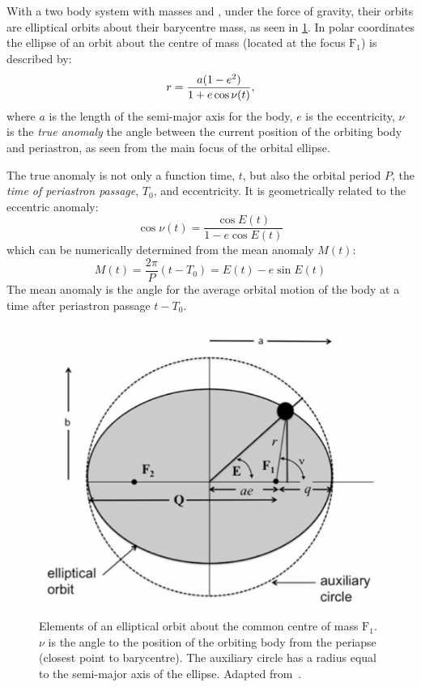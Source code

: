 With a two body system with masses \Mone{} and \Mtwo{}, under the force of gravity, their orbits are elliptical orbits about their barycentre mass, as seen in \cref{fig:eclipesorbit}.
In polar coordinates the ellipse of an orbit about the centre of mass (located at the focus $\textrm{F}_1$) is described by:
\begin{equation}
    r = \frac{a(1 - {e}^{2})}{1 + e \cos{\nu(t)}},
\end{equation}
where \(a\) is the length of the semi-major axis for the body, \(e\) is the eccentricity, $\nu$ is the \emph{true anomaly} the angle between the current position of the orbiting body and periastron, as seen from the main focus of the orbital ellipse.

The true anomaly is not only a function time, \(t\), but also the orbital period \(P\), the \emph{time of periastron passage}, \(T_0\), and eccentricity.
It is geometrically related to the eccentric anomaly:
\begin{equation}
    \cos{\nu(t)} = \frac{\cos{E(t)}}{1 - e \cos{E(t)}}
\end{equation}
which can be numerically determined from the mean anomaly \(M(t)\):
\begin{equation}
    M(t) = \frac{2 \pi}{P}(t - T_0) = E(t) - e \sin{E(t)}
\end{equation}
The mean anomaly is the angle for the average orbital motion of the body at a time after periastron passage \(t-T_0\).

\begin{figure}
    \centering
    \includegraphics[width=0.55\linewidth]{figures/fundamental_rv/eclipes_orbit2.pdf}
    \caption[Elements of an elliptical orbit.]{Elements of an elliptical orbit about the common centre of mass \(\textrm{F}_1\).
        {\(\nu\)} is the angle to the position of the orbiting body from the periapse (closest point to barycentre).
        The auxiliary circle has a radius equal to the semi-major axis of the ellipse.
        Adapted from~\citet{bozza_methods_2016}.}
    \label{fig:eclipesorbit}
\end{figure}

